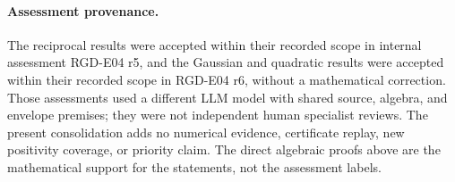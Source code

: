 \paragraph{Assessment provenance.}
The reciprocal results were accepted within their recorded scope in
internal assessment RGD-E04 r5, and the Gaussian and quadratic results
were accepted within their recorded scope in RGD-E04 r6, without a
mathematical correction.  Those assessments used a different LLM model
with shared source, algebra, and envelope premises; they were not
independent human specialist reviews.  The present consolidation adds
no numerical evidence, certificate replay, new positivity coverage, or
priority claim.  The direct algebraic proofs above are the mathematical
support for the statements, not the assessment labels.
